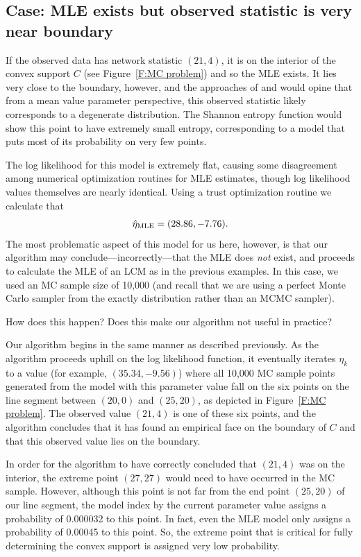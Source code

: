 \subsection{Case: MLE exists but observed statistic is very near boundary}
If the observed data has network statistic $(21, 4)$, it is on the interior of 
the convex support $C$ (see Figure~\ref{F:MC problem}) and so the MLE exists.
It lies very close to the boundary, however, and the approaches of 
\citet{Handcock:degeneracy} and \citet{Rinaldo:2009} would  
opine that from a mean value parameter perspective, this observed statistic likely 
corresponds to a degenerate distribution. The Shannon entropy function would show this 
point to have extremely small entropy, corresponding to a model that puts most of its 
probability on very few points.

The log likelihood for this model is extremely flat, causing some disagreement among 
numerical optimization routines for MLE estimates, though log likelihood values 
themselves are nearly identical.  Using a trust optimization routine we calculate that 
\begin{align*}
\hat{\eta}_{\textrm{MLE}} = (28.86, -7.76).
\end{align*}
The most problematic aspect of this model for us here, however, is that our algorithm 
may conclude---incorrectly---that the MLE does \emph{not} exist, and proceeds to 
calculate the MLE of an LCM as in the previous examples.  In this case, we used
an MC sample size of 10,000 (and recall that we are using a perfect Monte Carlo sampler
from the exactly distribution rather than an MCMC sampler).

How does this happen?  Does this make our algorithm not useful in practice?

Our algorithm begins in the same manner as described previously.  As the algorithm 
proceeds uphill on the log likelihood function, it eventually iterates $\eta_k$ to a 
value (for example, $(35.34, -9.56)$) where all 10,000 MC sample points generated 
from the model with this parameter value fall on the six points on the line segment 
between $(20,0)$ and $(25,20)$, as depicted in Figure~\ref{F:MC problem}.  
The observed value $(21,4)$ is one of these six points, and the algorithm concludes
that it has found an empirical face on the boundary of $C$ and that 
this observed value lies on the boundary.

In order for the algorithm to have correctly concluded that $(21,4)$ was on the 
interior, the extreme point $(27,27)$ would need to have occurred in the MC sample.  However, although this point is not far from the end point $(25,20)$ of our line
segment, the model index by the current parameter value 
assigns a probability of 0.000032 to this point.  In fact, even the 
MLE model only assigns a probability of 0.00045 to this point.  
So, the extreme point that is critical for fully determining the convex support 
is assigned very low probability.

